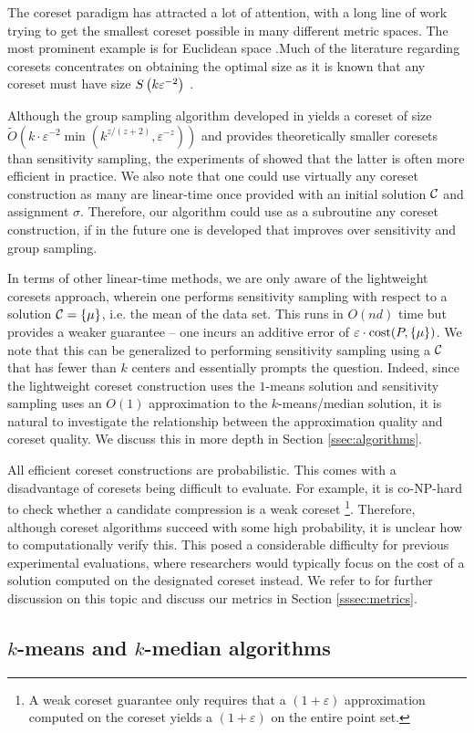 The coreset paradigm has attracted a lot of attention, with a long line of work trying to get the smallest coreset possible in many different metric spaces. The
most prominent example is for Euclidean space \cite{BadoiuHI02, HaM04, Chen09, HuangV20, stoc22}.Much of the literature regarding coresets concentrates on obtaining the optimal size as it is known
that any coreset must have size $S \left( k\varepsilon^{-2}\right)$ \cite{stoc22}. 

Although the group sampling algorithm developed in \cite{stoc21, stoc22} yields a coreset of size $\tilde{O}(k\cdot \varepsilon^{-2}
\min(k^{z/(z+2)},\varepsilon^{-z}))$ \cite{CLSSS22} and provides theoretically smaller coresets than sensitivity sampling, the experiments of \cite{chrisESA}
showed that the latter is often more efficient in practice. We also note that one could use virtually any coreset construction as many are linear-time once
provided with an initial solution $\mathcal C$ and assignment $\sigma$.  Therefore, our algorithm could use as a subroutine any coreset construction, if in the
future one is developed that improves over sensitivity and group sampling.

In terms of other linear-time methods, we are only aware of the lightweight coresets approach\cite{BachemL018}, wherein one performs sensitivity sampling with
respect to a solution $\mathcal C=\{\mu\}$, i.e. the mean of the data set. This runs in $O(nd)$ time but provides a weaker guarantee -- one incurs an additive error
of $\varepsilon\cdot \operatorname{cost}(P,\{\mu\})$.  We note that this can be generalized to performing sensitivity sampling using a $\mathcal C$ that has fewer than $k$ centers
and essentially prompts the question.  Indeed, since the lightweight coreset construction uses the $1$-means solution and sensitivity sampling uses an $O(1)$
approximation to the $k$-means/median solution, it is natural to investigate the relationship between the approximation quality and coreset quality. We discuss
this in more depth in Section \ref{ssec:algorithms}.

All efficient coreset constructions are probabilistic. This comes with a disadvantage of coresets being difficult to evaluate. For example, it is
co-NP-hard to check whether a candidate compression is a weak coreset \cite{chrisESA} \footnote{A weak coreset guarantee only requires that a $(1+\varepsilon)$
approximation computed on the coreset yields a $(1+\varepsilon)$ on the entire point set.}. Therefore, although coreset algorithms succeed with some high
probability, it is unclear how to computationally verify this.  This posed a considerable difficulty for previous experimental evaluations,
where researchers would typically focus on the cost of a solution computed on the designated coreset instead. We refer to \cite{chrisESA} for further discussion
on this topic and discuss our metrics in Section \ref{sssec:metrics}.

\subsection{$k$-means and $k$-median algorithms}
